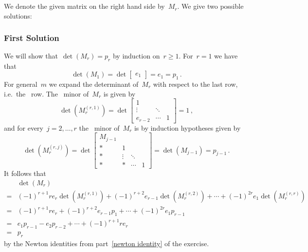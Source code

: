 \subsection{}

We denote the given matrix on the right hand side by~$M_r$.
We give two possible solutions:





\subsubsection{First Solution}

We will show that~$\det(M_r) = p_r$ by induction on~$r \geq 1$.
For~$r = 1$ we have that
\[
    \det( M_1 )
  = \det
    \begin{bmatrix}
      e_1
    \end{bmatrix}
  = e_1
  = p_1 \,.
\]
For general~$m$ we expand the determinant of~$M_r$ with respect to the last row, i.e.\ the~ row.
The~ minor of~$M_r$ is given by
\[
    \det( M_r^{(r,1)} )
  = \det
    \begin{bmatrix}
      1       &         &   \\
      \vdots  & \ddots  &   \\
      e_{r-2} & \cdots  & 1
    \end{bmatrix}
  = 1 \,,
\]
and for every~$j = 2, \dotsc, r$ the~ minor of~$M_r$ is by induction hypotheses given by
\[
    \det( M_r^{(r,j)} )
  = \det
    \begin{bmatrix}
      M_{j-1} &         &         &   \\
      *       & 1       &         &   \\
      *       & \vdots  & \ddots  &   \\
      *       & *       & \cdots  & 1
    \end{bmatrix}
  = \det( M_{j-1} )
  = p_{j-1} \,.
\]
It follows that
\begin{align*}
   {}&  \det(M_r) \\
  ={}&    (-1)^{r+1} r e_r\det( M_r^{(r,1)} )
        + (-1)^{r+2} e_{r-1} \det( M_r^{(r,2)} )
        + \dotsb
        + (-1)^{2r}  e_1 \det( M_r^{(r,r)} )  \\
  ={}&    (-1)^{r+1} r e_r
        + (-1)^{r+2} e_{r-1} p_1
        + \dotsb
        + (-1)^{2r} e_1 p_{r-1} \\
  ={}&    e_1 p_{r-1}
        - e_2 p_{r-2}
        + \dotsb
        + (-1)^{r+1} r e_r  \\
  ={}&  p_r
\end{align*}
by the Newton identities from part~\ref{newton identity} of the exercise.





